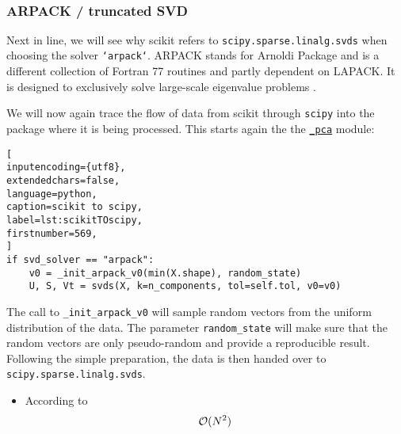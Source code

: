 \ \clearpage


\subsubsection{ARPACK / truncated SVD}

Next in line, we will see why \gls{scikit} refers to \texttt{scipy.sparse.linalg.svds} when choosing the solver \texttt{`arpack`}. 
ARPACK stands for Arnoldi Package and is a different collection of Fortran 77 routines and partly dependent on LAPACK.
It is designed to exclusively solve large-scale eigenvalue problems \cite{lehoucq1998arpack}.

We will now again trace the flow of data from \gls{scikit} through \texttt{scipy} into the package where it is being processed. This starts again the the \href{\scikitPCAvIxOxI{_pca}}{\texttt{\_pca}} module:

\begin{lstlisting}[
inputencoding={utf8}, 
extendedchars=false, 
language=python, 
caption=scikit to scipy, 
label=lst:scikitTOscipy,
firstnumber=569,
]
if svd_solver == "arpack":
    v0 = _init_arpack_v0(min(X.shape), random_state)
    U, S, Vt = svds(X, k=n_components, tol=self.tol, v0=v0)
\end{lstlisting}

\noindent
The call to \texttt{\_init\_arpack\_v0} will sample random vectors from the uniform distribution of the data.
The parameter \texttt{random\_state} will make sure that the random vectors are only pseudo-random and provide a reproducible result.
Following the simple preparation, the data is then handed over to \texttt{scipy.sparse.linalg.svds}.

\clearpage


\begin{itemize}
	\item According to \cite{brunton2019data, wright2001large}
	$$\mathcal{O}(N^2)$$

\end{itemize}

